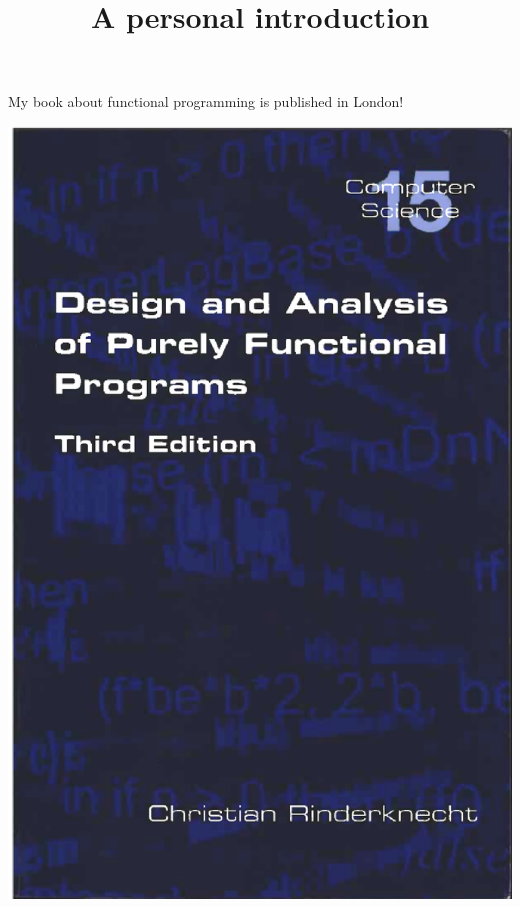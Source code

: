 \documentclass[wide]{slides}
\begin{document}
\begin{slide}
  \title{A personal introduction}

  \begin{minipage}{0.5\linewidth}
    My book about functional programming is published in London!
  \end{minipage}%
  \begin{minipage}{0.5\linewidth}
    \includegraphics[scale=0.35]{my_book.eps}
  \end{minipage}%

\end{slide}
\end{document}
